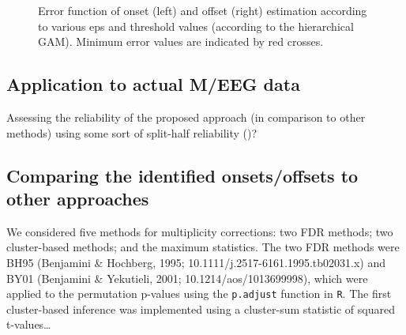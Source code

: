 \documentclass[
  doc,
  floatsintext,
  longtable,
  a4paper,
  nolmodern,
  notxfonts,
  notimes,
  colorlinks=true,linkcolor=blue,citecolor=blue,urlcolor=blue]{apa7}
\begin{document}
\begin{figure}[!htb]

\caption{\label{fig-onset-error}Error function of onset (left) and
offset (right) estimation according to various eps and threshold values
(according to the hierarchical GAM). Minimum error values are indicated
by red crosses.}


\end{figure}%

\newpage

\subsection{Application to actual M/EEG
data}\label{application-to-actual-meeg-data}

Assessing the reliability of the proposed approach (in comparison to
other methods) using some sort of split-half reliability
()?

\subsection{Comparing the identified onsets/offsets to other
approaches}\label{comparing-the-identified-onsetsoffsets-to-other-approaches}

We considered five methods for multiplicity corrections: two FDR
methods; two cluster-based methods; and the maximum statistics. The two
FDR methods were BH95 (Benjamini \& Hochberg, 1995;
10.1111/j.2517-6161.1995.tb02031.x) and BY01 (Benjamini \& Yekutieli,
2001; 10.1214/aos/1013699998), which were applied to the permutation
p-values using the \texttt{p.adjust} function in \texttt{R}. The first
cluster-based inference was implemented using a cluster-sum statistic of
squared t-values\ldots{}
\end{document}
